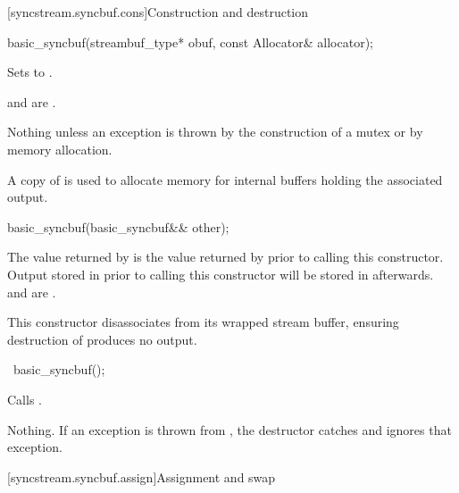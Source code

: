 [syncstream.syncbuf.cons]{Construction and destruction}

%
\begin{itemdecl}
basic_syncbuf(streambuf_type* obuf, const Allocator& allocator);
\end{itemdecl}

\begin{itemdescr}
\pnum
\effects
Sets  to .

\pnum
\ensures
{} and
 are .

\pnum
\throws
Nothing unless an exception is thrown
by the construction of a mutex or
by memory allocation.

\pnum
\remarks
A copy of  is used
to allocate memory for internal buffers
holding the associated output.
\end{itemdescr}

%
\begin{itemdecl}
basic_syncbuf(basic_syncbuf&& other);
\end{itemdecl}

\begin{itemdescr}
\pnum
\ensures
The value returned by 
is the value returned by 
prior to calling this constructor.
Output stored in 
prior to calling this constructor
will be stored in  afterwards.
and
are .

\pnum
\remarks
This constructor disassociates 
from its wrapped stream buffer,
ensuring destruction of  produces no output.
\end{itemdescr}

%
\begin{itemdecl}
~basic_syncbuf();
\end{itemdecl}

\begin{itemdescr}
\pnum
\effects
Calls .

\pnum
\throws
Nothing.
If an exception is thrown from ,
the destructor catches and ignores that exception.
\end{itemdescr}

[syncstream.syncbuf.assign]{Assignment and swap}

